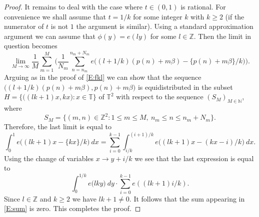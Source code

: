 \documentclass[11pt]{amsart}
\newcommand{\T}{\mathbb{T}}
\newcommand{\N}{\mathbb{N}}
\newcommand{\Z}{\mathbb{Z}}
\theoremstyle{plain}
\theoremstyle{definition}
\theoremstyle{remark}
\begin{document}
\begin{proof}
It remains to deal with  the case where  $t\in (0,1)$ is rational. For convenience we shall assume
that $t=1/k$ for some integer $k$ with $k\geq 2$ (if the numerator of $t$ is not $1$ the argument is similar).  Using a standard
approximation argument we can assume that $\phi(y)=e(ly)$ for some
$l\in\Z$. Then the limit in question becomes
$$
\lim_{M\to\infty}\frac{1}{M}\sum_{m=1}^M\Big( \frac{1}{N_m}
\sum_{n=n_m}^{n_m+N_m}
e\big((l+1/k)(p(n)+m\beta)-\{p(n)+m\beta\}/k\big)\Big).
$$
Arguing as in the proof of \eqref{E:fkl} we can show that the sequence $\big((l+1/k)(p(n)+m\beta),
p(n)+m\beta\big)$ is equidistributed  in the subset $H=\big\{\big((lk+1)x, kx\big)\colon x\in \T\big\}$ of $\T^2$ with respect to the sequence
$(S_M)_{M\in\N}$, where
$$S_M=\{(m,n)\in\Z^2\colon 1\leq m\leq M, \ n_m\leq n\leq n_m+N_m\}.$$
 Therefore, the last limit is equal to
$$
\int_0^1 e\big((lk+1)x- \{kx\}/k\big) \ dx=\sum_{i=0}^{k-1}
\int_{i/k}^{(i+1)/k}e\big((lk+1)x- (kx-i)/k\big)\ dx.
$$
Using the change of variables $x\to y+i/k$ we see that the last
expression is equal to
\begin{equation}\label{E:sum}
  \int_{0}^{1/k}e\big(lk y \big) \ dy \cdot \sum_{i=0}^{k-1} e((lk+1)i/k).
\end{equation}
Since $l\in \Z$ and $k\geq 2$ we have $lk+1\neq 0$.  It
follows that the sum appearing in \eqref{E:sum} is zero. This
completes the proof.
\end{proof}
\end{document}
